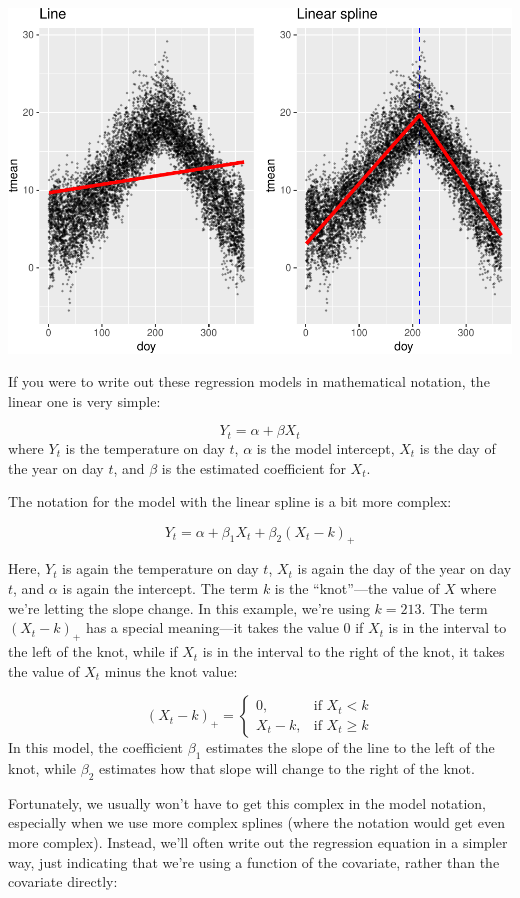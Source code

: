 \documentclass[
]{book}
\begin{document}
\includegraphics{adv_epi_analysis_files/figure-latex/unnamed-chunk-42-1.pdf}

If you were to write out these regression models in mathematical notation, the
linear one is very simple:

\[
Y_t = \alpha + \beta X_t
\]
where \(Y_t\) is the temperature on day \(t\), \(\alpha\) is the model intercept,
\(X_t\) is the day of the year on day \(t\), and \(\beta\) is the estimated coefficient
for \(X_t\).

The notation for the model with the linear spline is a bit more complex:

\[
Y_t = \alpha + \beta_1 X_t + \beta_2 (X_t - k)_+
\]

Here, \(Y_t\) is again the temperature on day \(t\), \(X_t\) is again the day of the year
on day \(t\), and \(\alpha\) is again the intercept. The term \(k\) is the ``knot''---the
value of \(X\) where we're letting the slope change. In this example, we're using
\(k = 213\). The term \((X_t - k)_+\) has a special meaning---it takes the value
0 if \(X_t\) is in the interval to the left of the knot, while if \(X_t\) is in the
interval to the right of the knot, it takes the value of \(X_t\) minus the knot
value:

\[ 
(X_t - k)_+ =
\begin{cases}
0, & \mbox{if } X_t < k \\
X_t - k, & \mbox{if } X_t \ge k 
\end{cases}
\]
In this model, the coefficient \(\beta_1\) estimates the slope of the line to the
left of the knot, while \(\beta_2\) estimates how that slope will change to the
right of the knot.

Fortunately, we usually won't have to get this complex in the model notation,
especially when we use more complex splines (where the notation would get even
more complex). Instead, we'll often write out the
regression equation in a simpler way, just indicating that we're using a function
of the covariate, rather than the covariate directly:
\end{document}
